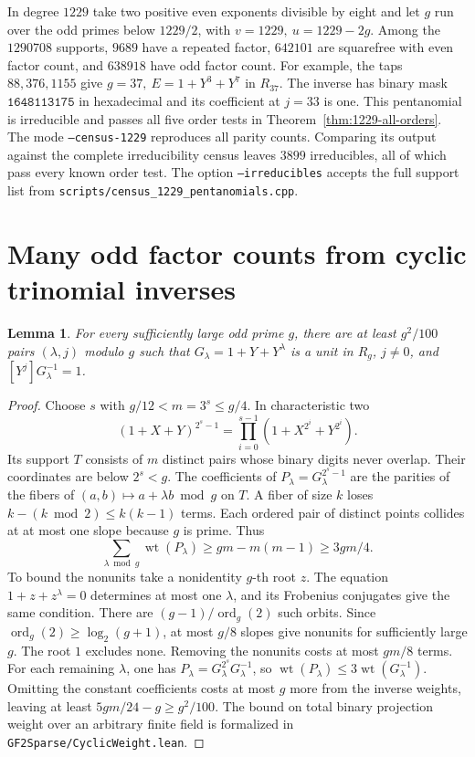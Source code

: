 \documentclass[11pt]{article}
\newtheorem{lemma}[theorem]{Lemma}
\begin{document}
In degree \(1229\) take two positive even exponents divisible by
eight and let \(g\) run over the odd primes below \(1229/2\), with
\(v=1229,\ u=1229-2g\). Among the \(1290708\) supports, \(9689\)
have a repeated factor, \(642101\) are squarefree with even factor
count, and \(638918\) have odd factor count. For example, the taps
\(88,376,1155\) give \(g=37,\ E=1+Y^3+Y^7\) in \(R_{37}\).
The inverse has binary mask \(\mathtt{1648113175}\) in hexadecimal
and its coefficient at \(j=33\) is one. This pentanomial is irreducible
and passes all five order tests in Theorem~\ref{thm:1229-all-orders}.
The mode \texttt{--census-1229} reproduces all parity counts.
Comparing its output against the complete irreducibility census
leaves \(3899\) irreducibles, all of which pass every known order
test. The option \texttt{--irreducibles} accepts the full support
list from \nolinkurl{scripts/census_1229_pentanomials.cpp}.

\section{Many odd factor counts from cyclic trinomial inverses}
\label{sec:cyclic-density}
\begin{lemma}\label{lem:prime-inverse-weight}
For every sufficiently large odd prime \(g\), there are at least
\(g^2/100\) pairs \((\lambda,j)\) modulo \(g\) such that
\(G_\lambda=1+Y+Y^\lambda\) is a unit in \(R_g\), \(j\ne0\),
and \([Y^j]G_\lambda^{-1}=1\).
\end{lemma}
\begin{proof}
Choose \(s\) with \(g/12< m=3^s\le g/4\). In characteristic two
\[
 (1+X+Y)^{2^s-1}=\prod_{i=0}^{s-1}(1+X^{2^i}+Y^{2^i}).
\]
Its support \(T\) consists of \(m\) distinct pairs whose binary
digits never overlap. Their coordinates are below \(2^s<g\).
The coefficients of \(P_\lambda=G_\lambda^{2^s-1}\) are the parities
of the fibers of \((a,b)\mapsto a+\lambda b\bmod g\) on \(T\).
A fiber of size \(k\) loses \(k-(k\bmod2)\le k(k-1)\) terms.
Each ordered pair of distinct points collides at at most one slope
because \(g\) is prime. Thus
\[
   \sum_{\lambda\bmod g}\operatorname{wt}(P_\lambda)
       \ge gm-m(m-1)\ge 3gm/4.
\]
To bound the nonunits take a nonidentity \(g\)-th root \(z\).
The equation \(1+z+z^\lambda=0\) determines at most one \(\lambda\),
and its Frobenius conjugates give the same condition. There are
\((g-1)/\operatorname{ord}_g(2)\) such orbits. Since
\(\operatorname{ord}_g(2)\ge\log_2(g+1)\), at most \(g/8\) slopes
give nonunits for sufficiently large \(g\). The root \(1\) excludes
none. Removing the nonunits costs at most \(gm/8\) terms.
For each remaining \(\lambda\), one has
\(P_\lambda=G_\lambda^{2^s}G_\lambda^{-1}\), so
\(\operatorname{wt}(P_\lambda)\le3\operatorname{wt}(G_\lambda^{-1})\).
Omitting the constant coefficients costs at most \(g\) more from the
inverse weights, leaving at least \(5gm/24-g\ge g^2/100\).
The bound on total binary projection weight over an arbitrary
finite field is formalized in \nolinkurl{GF2Sparse/CyclicWeight.lean}.
\end{proof}
\end{document}
